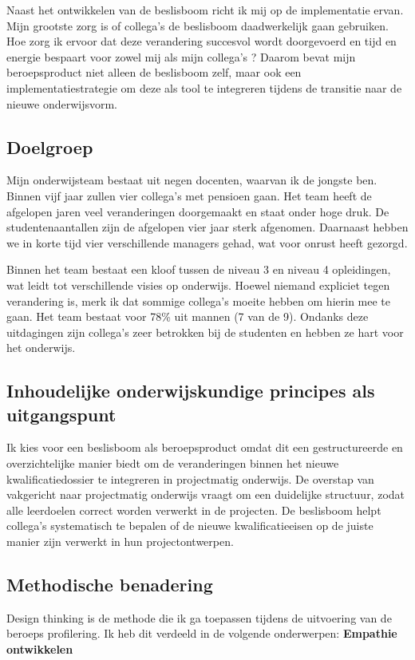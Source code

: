 Naast het ontwikkelen van de beslisboom richt ik mij op de implementatie ervan. Mijn grootste zorg is of collega's
de beslisboom daadwerkelijk gaan gebruiken. Hoe zorg ik ervoor dat deze verandering succesvol wordt doorgevoerd en tijd en energie bespaart voor zowel mij als mijn collega's
? Daarom bevat mijn beroepsproduct niet alleen de beslisboom zelf, maar ook een implementatiestrategie om deze als tool te integreren tijdens de transitie naar de nieuwe onderwijsvorm.
\subsection{Doelgroep}
Mijn onderwijsteam bestaat uit negen docenten, waarvan ik de jongste ben. Binnen vijf jaar zullen vier collega's
 met pensioen gaan. Het team heeft de afgelopen jaren veel veranderingen doorgemaakt en staat onder hoge druk. De studentenaantallen zijn de afgelopen vier jaar sterk afgenomen. Daarnaast hebben we in korte tijd vier verschillende managers gehad, wat voor onrust heeft gezorgd.

Binnen het team bestaat een kloof tussen de niveau 3 en niveau 4 opleidingen, wat leidt tot verschillende visies op onderwijs. Hoewel niemand expliciet tegen verandering is, merk ik dat sommige collega's
 moeite hebben om hierin mee te gaan. Het team bestaat voor 78\% uit mannen (7 van de 9). Ondanks deze uitdagingen zijn collega's
 zeer betrokken bij de studenten en hebben ze hart voor het onderwijs.
\subsection{Inhoudelijke onderwijskundige principes als uitgangspunt}
Ik kies voor een beslisboom als beroepsproduct omdat dit een gestructureerde en overzichtelijke manier biedt om de veranderingen binnen het nieuwe kwalificatiedossier te integreren in projectmatig onderwijs. De overstap van vakgericht naar projectmatig onderwijs vraagt om een duidelijke structuur, zodat alle leerdoelen correct worden verwerkt in de projecten. De beslisboom helpt collega's
 systematisch te bepalen of de nieuwe kwalificatieeisen op de juiste manier zijn verwerkt in hun projectontwerpen.
\subsection{Methodische benadering}
Design thinking is de methode die ik ga toepassen tijdens de uitvoering van de beroeps profilering. Ik heb dit verdeeld in de volgende onderwerpen:
\textbf{Empathie ontwikkelen}

